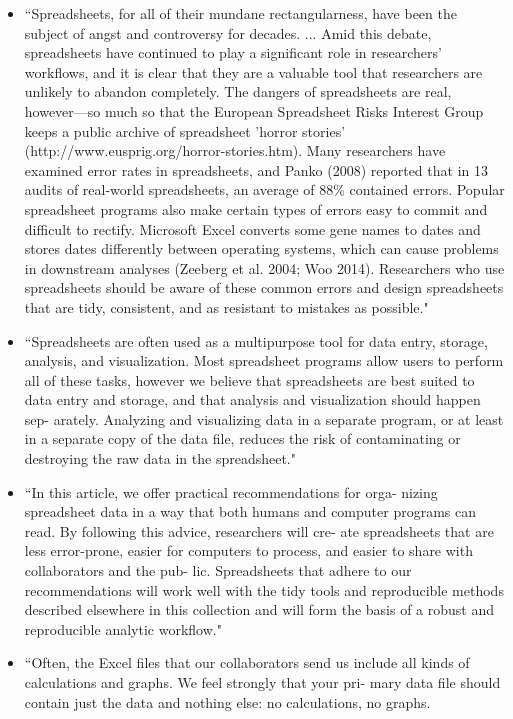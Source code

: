 \documentclass[pdftex,english,11pt,parskip=half]{scrartcl}
\begin{document}
\begin{itemize}
\item ``Spreadsheets, for all of their mundane rectangularness, have been the subject of angst and controversy for decades. ... Amid this debate, spreadsheets have continued to play a significant role in researchers’ workflows, and it is clear that they are a valuable tool that researchers are unlikely to abandon completely. The dangers of spreadsheets are real, however—so much so that the European Spreadsheet Risks Interest Group keeps a public archive of spreadsheet 'horror stories' (http://www.eusprig.org/horror-stories.htm). Many researchers have examined error rates in spreadsheets, and Panko (2008) reported that in 13 audits of real-world spreadsheets, an average of 88\% contained errors. Popular spreadsheet programs also make certain types of errors easy to commit and difficult to rectify. Microsoft Excel converts some gene names to dates and stores dates differently between operating systems, which can cause problems in downstream analyses (Zeeberg et al. 2004; Woo 2014). Researchers who use spreadsheets should be aware of these common errors and design spreadsheets that are tidy, consistent, and as resistant to mistakes as possible." \cite{broman2018data} 
\item ``Spreadsheets are often used as a multipurpose tool for data entry, storage, analysis, and visualization. Most spreadsheet programs allow users to perform all of these tasks, however we believe that spreadsheets are best suited to data entry and storage, and that analysis and visualization should happen sep- arately. Analyzing and visualizing data in a separate program, or at least in a separate copy of the data file, reduces the risk of contaminating or destroying the raw data in the spreadsheet." \cite{broman2018data} 
\item ``In this article, we offer practical recommendations for orga- nizing spreadsheet data in a way that both humans and computer programs can read. By following this advice, researchers will cre- ate spreadsheets that are less error-prone, easier for computers to process, and easier to share with collaborators and the pub- lic. Spreadsheets that adhere to our recommendations will work well with the tidy tools and reproducible methods described elsewhere in this collection and will form the basis of a robust and reproducible analytic workflow." \cite{broman2018data} 
\item ``Often, the Excel files that our collaborators send us include all kinds of calculations and graphs. We feel strongly that your pri- mary data file should contain just the data and nothing else: no calculations, no graphs.

\end{itemize}
\end{document}
